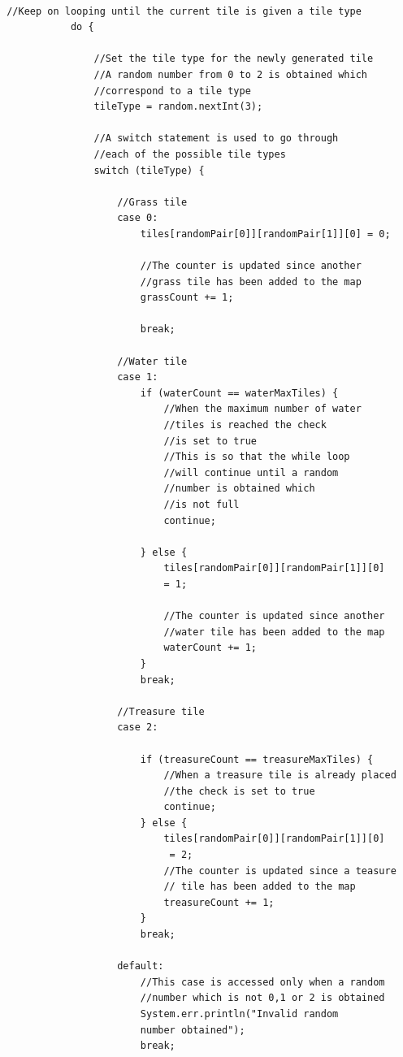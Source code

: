 \documentclass[a4paper,12pt]{extarticle}
\begin{document}
\begin{lstlisting}

 //Keep on looping until the current tile is given a tile type
            do {

                //Set the tile type for the newly generated tile
                //A random number from 0 to 2 is obtained which 
                //correspond to a tile type
                tileType = random.nextInt(3);

                //A switch statement is used to go through
                //each of the possible tile types
                switch (tileType) {

                    //Grass tile
                    case 0:
                        tiles[randomPair[0]][randomPair[1]][0] = 0;

                        //The counter is updated since another 
                        //grass tile has been added to the map
                        grassCount += 1;

                        break;

                    //Water tile
                    case 1:
                        if (waterCount == waterMaxTiles) {
                            //When the maximum number of water 
                            //tiles is reached the check 
                            //is set to true
                            //This is so that the while loop 
                            //will continue until a random 
                            //number is obtained which
                            //is not full
                            continue;

                        } else {
                            tiles[randomPair[0]][randomPair[1]][0] 
                            = 1;

                            //The counter is updated since another 
                            //water tile has been added to the map
                            waterCount += 1;
                        }
                        break;

                    //Treasure tile
                    case 2:

                        if (treasureCount == treasureMaxTiles) {
                            //When a treasure tile is already placed 
                            //the check is set to true
                            continue;
                        } else {
                            tiles[randomPair[0]][randomPair[1]][0]
                             = 2;
                            //The counter is updated since a teasure
                            // tile has been added to the map
                            treasureCount += 1;
                        }
                        break;

                    default:
                        //This case is accessed only when a random 
                        //number which is not 0,1 or 2 is obtained
                        System.err.println("Invalid random 
                        number obtained");
                        break;
                
\end{lstlisting}
\end{document}
